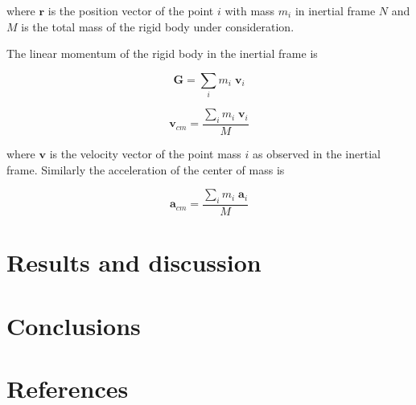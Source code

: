 \documentclass[preprint,12pt]{elsarticle}
\newcommand{\ten}[1]{\ensuremath{\mathbf{#1}}}
\begin{document}
\noindent where $\ten{r}$ is the position vector of the point $i$ with mass
$m_i$ in inertial frame $N$ and $M$ is the total mass of the rigid body under
consideration.


The linear momentum of the rigid body in the inertial frame is


\begin{equation}
  \label{eq:lin-mom-of-rigid-body}
  \ten{G} = \sum_i m_i \; \ten{v}_i
\end{equation}


\begin{equation}
  \label{eq:center-of-mass-velocity}
  \ten{v}_{cm} = \frac{\sum_i m_i \; \ten{v}_i}{M}
\end{equation}

\noindent where $\ten{v}$ is the velocity vector of the point mass $i$ as
observed in the inertial frame. Similarly the acceleration of the center of
mass is


\begin{equation}
  \label{eq:acceleration-of-rigid-body}
  \ten{a}_{cm} = \frac{\sum_i m_i \; \ten{a}_i}{M}
\end{equation}




\section{Results and discussion}
\label{sec:results}


\section{Conclusions}
\label{sec:conclusions}


\section*{References}


\end{document}
